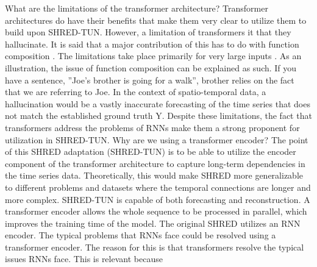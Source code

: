 \documentclass[11pt, a4paper]{article}
\begin{document}
What are the limitations of the transformer architecture? Transformer architectures do have their benefits
that make them very clear to utilize them to build upon SHRED-TUN. However, a limitation of transformers
it that they hallucinate. It is said that a major contribution of this has to do with function composition
\cite{peng2024limitationstransformerarchitecture}. The limitations take place primarily for very large inputs \cite{peng2024limitationstransformerarchitecture}. As an illustration, the issue of function
composition can be explained as such. If you have a sentence, ”Joe’s brother is going for a walk”, brother
relies on the fact that we are referring to Joe. In the context of spatio-temporal data, a hallucination would
be a vastly inaccurate forecasting of the time series that does not match the established ground truth
Y. Despite these limitations, the fact that transformers address the problems of RNNs make them a strong
proponent for utilization in SHRED-TUN.
Why are we using a transformer encoder? The point of this SHRED adaptation (SHRED-TUN) is to be
able to utilize the encoder component of the transformer architecture to capture long-term dependencies in
the time series data. Theoretically, this would make SHRED more generalizable to different problems and
datasets where the temporal connections are longer and more complex. SHRED-TUN is capable of both
forecasting and reconstruction. A transformer encoder allows the whole sequence to be processed in parallel,
which improves the training time of the model. The original SHRED utilizes an RNN encoder. The typical
problems that RNNs face could be resolved using a transformer encoder. The reason for this is that
transformers resolve the typical issues RNNs face. This is relevant because
\end{document}
